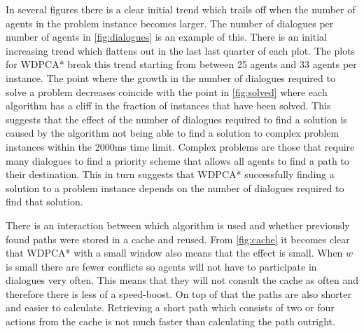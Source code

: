 In several figures there is a clear initial trend which trails off when the
number of agents in the problem instance becomes larger. The number of
dialogues per number of agents in \autoref{fig:dialogues} is an example of
this. There is an initial increasing trend which flattens out in the last last
quarter of each plot. The plots for WDPCA* break this trend starting
from between 25 agents and 33 agents per instance. The point where the growth
in the number of dialogues required to solve a problem decreases coincide with
the point in \autoref{fig:solved} where each algorithm has a cliff in the
fraction of instances that have been solved. This suggests that the effect of
the number of dialogues required to find a solution is caused by the algorithm
not being able to find a
solution to complex problem instances within the 2000ms time limit. Complex
problems are those that require many dialogues to find a priority scheme that
allows all agents to find a path to their destination. This in turn suggests
that WDPCA* successfully finding a solution to a problem instance depends on the
number of dialogues required to find that solution.

There is an interaction between which algorithm is used and whether previously
found paths were stored in a cache and reused. From \autoref{fig:cache} it
becomes clear that WDPCA* with a small window also means that the effect is
small. When $w$ is small there are fewer conflicts so agents will not have
to participate in dialogues very often. This means that they will not consult
the cache as often and therefore there is less of a speed-boost. On top of that
the paths are also shorter and easier to calculate. Retrieving a short path
which consists of two or four actions from the cache is not much faster than 
calculating the path outright.

